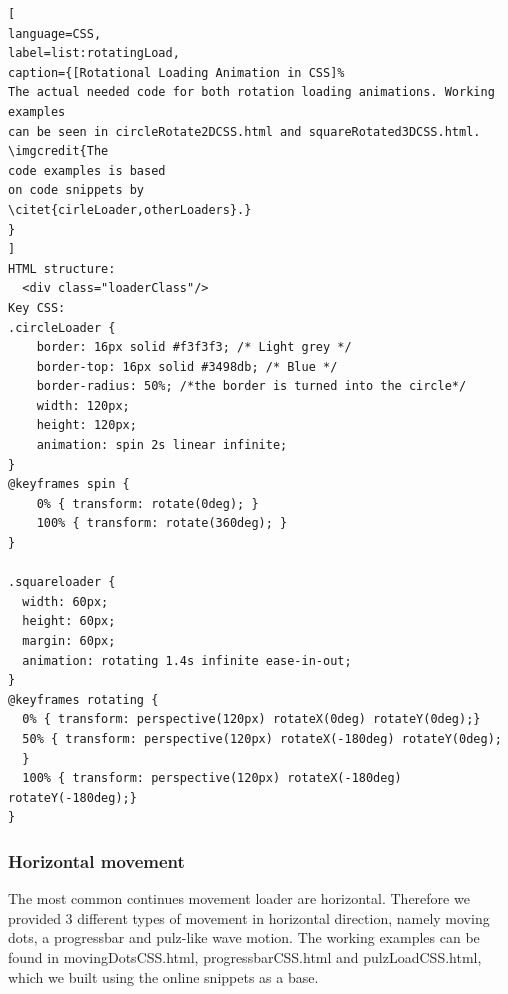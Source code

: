 \begin{lstlisting}[
language=CSS,
label=list:rotatingLoad,
caption={[Rotational Loading Animation in CSS]%
The actual needed code for both rotation loading animations. Working examples 
can be seen in circleRotate2DCSS.html and squareRotated3DCSS.html. 
\imgcredit{The 
code examples is based 
on code snippets by 
\citet{cirleLoader,otherLoaders}.}
}
]
HTML structure:
  <div class="loaderClass"/>
Key CSS:
.circleLoader {
	border: 16px solid #f3f3f3; /* Light grey */
	border-top: 16px solid #3498db; /* Blue */
	border-radius: 50%; /*the border is turned into the circle*/
	width: 120px;
	height: 120px;
	animation: spin 2s linear infinite;
}
@keyframes spin {
	0% { transform: rotate(0deg); }
	100% { transform: rotate(360deg); }
}

.squareloader {
  width: 60px;
  height: 60px;
  margin: 60px;
  animation: rotating 1.4s infinite ease-in-out;
}
@keyframes rotating {
  0% { transform: perspective(120px) rotateX(0deg) rotateY(0deg);}
  50% { transform: perspective(120px) rotateX(-180deg) rotateY(0deg);
  }
  100% { transform: perspective(120px) rotateX(-180deg) rotateY(-180deg);}
}
\end{lstlisting}

\subsubsection{Horizontal movement} %
\label{subsub:horizontalMovement}
The most common continues movement loader are horizontal. Therefore we provided 
3 different types of movement in horizontal direction, namely moving dots, a 
progressbar and pulz-like wave motion. The working examples can be found in  
movingDotsCSS.html, progressbarCSS.html and pulzLoadCSS.html, which we built 
using the \citet{otherLoaders} online snippets as a base.


